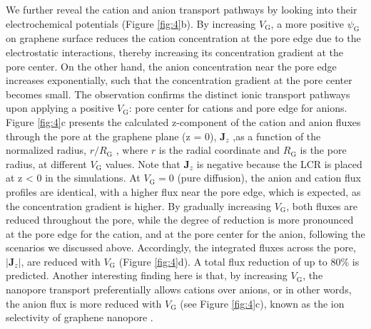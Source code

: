 \documentclass[manuscript=letter, email=true, hyperref=true, keywords=false]{achemso}
\begin{document}
We further reveal the cation and anion transport pathways by looking
into their electrochemical potentials (Figure \ref{fig:4}b). By
increasing $V_{\mathrm{G}}$, a more positive $\psi_{\mathrm{G}}$ on
graphene surface reduces the cation concentration at the pore edge due
to the electrostatic interactions, thereby increasing its
concentration gradient at the pore center. On the other hand, the
anion concentration near the pore edge increases exponentially, such
that the concentration gradient at the pore center becomes small. The
observation confirms the distinct ionic transport pathways upon
applying a positive $V_{\mathrm{G}}$: pore center for cations and pore
edge for anions. Figure \ref{fig:4}c presents the calculated
z-component of the cation and anion fluxes through the pore at the
graphene plane (z = 0), $\boldsymbol{J}_{z}$ ,as a function of the
normalized radius, $r/R_{\mathrm{G}}$ , where $r$ is the radial
coordinate and $R_{\mathrm{G}}$ is the pore radius, at different
$V_{\mathrm{G}}$ values. Note that $\boldsymbol{J}_{z}$ is negative
because the LCR is placed at z < 0 in the simulations. At
$V_{\mathrm{G}}=$0 (pure diffusion), the anion and cation flux
profiles are identical, with a higher flux near the pore edge, which
is expected, as the concentration gradient is higher. By gradually
increasing $V_{\mathrm{G}}$, both fluxes are reduced throughout the
pore, while the degree of reduction is more pronounced at the pore
edge for the cation, and at the pore center for the anion, following
the scenarios we discussed above. Accordingly, the integrated fluxes
across the pore, $|\boldsymbol{J}_{z}|$, are reduced with
$V_{\mathrm{G}}$ (Figure \ref{fig:4}d). A total flux reduction of up
to 80\% is predicted. Another interesting finding here is that, by
increasing $V_{\mathrm{G}}$, the nanopore transport preferentially
allows cations over anions, or in other words, the anion flux is more
reduced with $V_{\mathrm{G}}$ (see Figure \ref{fig:4}c), known as the
ion selectivity of graphene nanopore .
\end{document}

